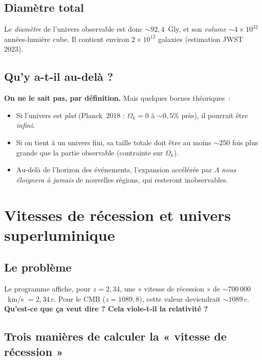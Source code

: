 \documentclass[11pt,a4paper,openany]{report}
\newcommand{\Ok}{\Omega_{k}}
\begin{document}
\section{Diamètre total}

Le \emph{diamètre} de l'univers observable est donc $\sim 92{,}4$~Gly, et son
\emph{volume} $\sim 4\times 10^{32}$ années-lumière cube. Il contient environ
$2\times 10^{12}$ galaxies (estimation JWST 2023).

\section{Qu'y a-t-il au-delà ?}

\begin{tcolorbox}[approfondir]
\textbf{On ne le sait pas, par définition.} Mais quelques bornes
théoriques~:
\begin{itemize}[topsep=2pt]
\item Si l'univers est \emph{plat} (Planck~2018 : $\Ok = 0$ à $\sim 0{,}5\%$
  près), il pourrait être \emph{infini}.
\item Si on tient à un univers fini, sa taille totale doit être au moins
  $\sim 250$ fois plus grande que la partie observable (contrainte sur
  $\Ok$).
\item Au-delà de l'horizon des événements, l'expansion accélérée par
  $\Lambda$ \emph{nous éloignera à jamais} de nouvelles régions, qui
  resteront inobservables.
\end{itemize}
\end{tcolorbox}

\chapter{Vitesses de récession et univers superluminique}
\label{chap:vrec}

\section{Le problème}

Le programme affiche, pour $z = 2{,}34$, une « vitesse de récession » de
$\sim 700\,000$~km/s $= 2{,}34\,c$. Pour le CMB ($z = 1089{,}8$), cette
valeur deviendrait $\sim 1089\,c$. \textbf{Qu'est-ce que ça veut dire ?
Cela viole-t-il la relativité ?}

\section{Trois manières de calculer la « vitesse de récession »}
\end{document}

